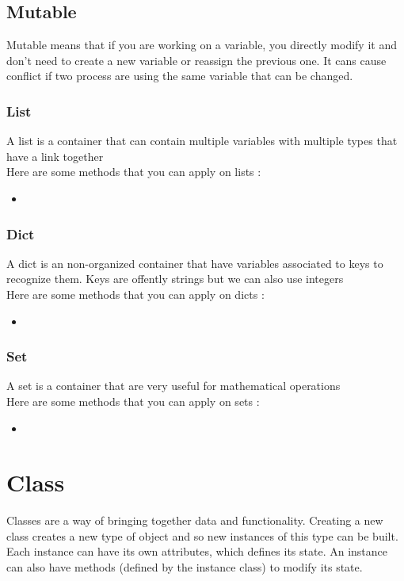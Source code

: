 \documentclass[a4paper, 12pt]{article}
\begin{document}
\subsection{Mutable}
Mutable means that if you are working on a variable, you directly modify it and don't need to create a new variable or reassign the previous one. It cans cause conflict if two process are using the same variable that can be changed.\newline

\subsubsection{List}
A list is a container that can contain multiple variables with multiple types that have a link together\\
Here are some methods that you can apply on lists : 
\begin{itemize}
\item
\end{itemize}

\subsubsection{Dict}
A dict is an non-organized container that have variables associated to keys to recognize them. Keys are offently strings but we can also use integers\\
Here are some methods that you can apply on dicts : 
\begin{itemize}
\item
\end{itemize}

\subsubsection{Set}
A set is a container that are very useful for mathematical operations\\
Here are some methods that you can apply on sets : 
\begin{itemize}
\item
\end{itemize}

\newpage
\section{Class}
Classes are a way of bringing together data and functionality. Creating a new class creates a new type of object and so new instances of this type can be built. Each instance can have its own attributes, which defines its state. An instance can also have methods (defined by the instance class) to modify its state.\newline
\end{document}
